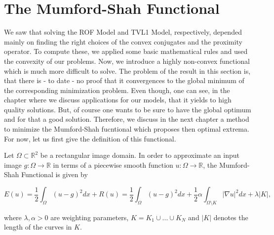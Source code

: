 \section{The Mumford-Shah Functional} %
\label{sec:the_mumford_shah_functional}
    
    We saw that solving the ROF Model and TVL1 Model, respectively, depended mainly on finding the right choices of the convex conjugates and the proximity operator. To compute these, we applied some basic mathematical rules and used the convexity of our problems. Now, we introduce a highly non-convex functional which is much more difficult to solve. The problem of the result in this section is, that there is - to date - no proof that it convergences to the global minimum of the corresponding minimization problem. Even though, one can see, in the chapter where we discuss applications for our models, that it yields to high quality solutions. But, of course one wants to be sure to have the global optimum and for that a good solution. Therefore, we discuss in the next chapter a method to minimize the Mumford-Shah fucntional which proposes then optimal extrema. For now, let us first give the definition of this functional.

    \begin{definition} %
    \label{def:the_mumford_shah_functional}

        Let $\Omega \subset \mathbb{R}^{2}$ be a rectangular image domain. In order to approximate an input image $g: \Omega \longrightarrow \mathbb{R}$ in terms of a piecewise smooth function $u: \Omega \longrightarrow \mathbb{R}$, the Mumford-Shah Functional is given by
                
                \begin{equation}
                    E(u) = \frac{1}{2} \int_{\Omega} (u - g)^{2} dx + R(u) = \frac{1}{2} \int_{\Omega} (u - g)^{2} dx + \frac{1}{2} \alpha \int_{\Omega \setminus K} |\nabla u|^{2} dx + \lambda |K|,
                \end{equation}
                \label{eq:the_mumford_shah_functional}
            
            where $\lambda, \alpha > 0$ are weighting parameters, $K = K_{1} \cup ... \cup K_{N}$ and $|K|$ denotes the length of the curves in $K$.

    \end{definition}


